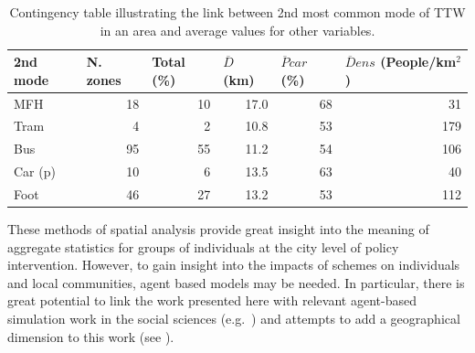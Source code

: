 
\begin{table}[htbp]
\caption[The 2nd most common mode of commuting compared with other factors]
{Contingency table illustrating the link between 2nd most common mode of
TTW in an area and average values for other variables.}
\begin{center}
\begin{tabular}{lrrrrr}
\toprule
2nd mode & \multicolumn{1}{l}{N. zones} & \multicolumn{1}{l}{Total (\%)} &
\multicolumn{1}{l}{$\overline{D}$ (km) } &
\multicolumn{1}{l}{$\overline{P}car$ (\%)} &
\multicolumn{1}{l}{$\overline{D}ens$ (People/km$^2$)} \\
\midrule
MFH & 18 & 10 & 17.0 & 68 & 31 \\ 
Tram & 4 & 2 & 10.8 & 53 & 179 \\ 
Bus & 95 & 55 & 11.2 & 54 & 106 \\ 
Car (p) & 10 & 6 & 13.5 & 63 & 40 \\ 
Foot & 46 & 27 & 13.2 & 53 & 112 \\
\bottomrule
\end{tabular}\end{center}
\label{t:cont}
\end{table}

These methods of spatial analysis provide great insight into the meaning of
aggregate statistics for groups of individuals at the city level of policy
intervention. However, to gain insight into the impacts of schemes on
individuals and local communities, agent based models may be needed.
In particular, there is great potential to link the work
presented here with relevant agent-based simulation work in the social
sciences (e.g.~\citealp{Gilbert2005a, Gilbert2007}) and
attempts to add a geographical dimension to this work
(see \citealp{Wu2008}).

